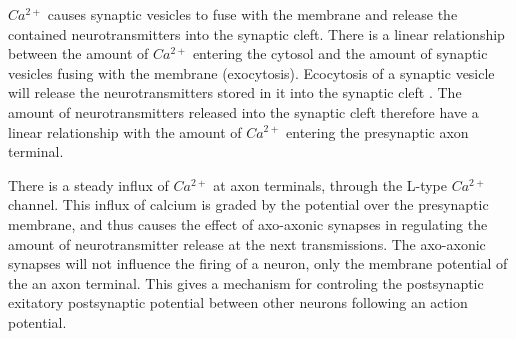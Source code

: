 $Ca^{2+}$ causes synaptic vesicles to fuse with the membrane and release the contained neurotransmitters into the synaptic cleft.%
There is a linear relationship between the amount of $Ca^{2+}$ entering the cytosol and the amount of synaptic vesicles fusing with the membrane (exocytosis).%
Ecocytosis of a synaptic vesicle will release the neurotransmitters stored in it into the synaptic cleft \cite{PrinciplesOfNeuralScience4edKAP10}. 
The amount of neurotransmitters released into the synaptic cleft therefore have a linear relationship with the amount of $Ca^{2+}$ entering the presynaptic axon terminal.


There is a steady influx of $Ca^{2+}$ at axon terminals, through the L-type $Ca^{2+}$ channel\cite{PrinciplesOfNeuralScience4edKAP14}. 
This influx of calcium is graded by the potential over the presynaptic membrane, and thus causes the effect of axo-axonic synapses in regulating the amount of neurotransmitter release at the next transmissions\cite{PrinciplesOfNeuralScience4edKAP14}.%
The axo-axonic synapses will not influence the firing of a neuron, only the membrane potential of the an axon terminal. %
This gives a mechanism for controling the postsynaptic exitatory postsynaptic potential between other neurons following an action potential.

